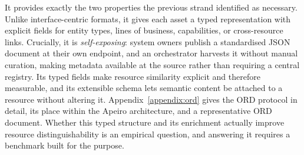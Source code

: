 \documentclass[10pt,twocolumn]{article}
\begin{document}
It provides exactly the two properties the previous strand identified as necessary. Unlike interface-centric formats, it gives each asset a typed representation with explicit fields for entity types, lines of business, capabilities, or cross-resource links. Crucially, it is \emph{self-exposing}: system owners publish a standardised JSON document at their own endpoint, and an orchestrator harvests it without manual curation, making metadata available at the source rather than requiring a central registry. Its typed fields make resource similarity explicit and therefore measurable, and its extensible schema lets semantic content be attached to a resource without altering it. Appendix~\ref{appendix:ord} gives the ORD protocol in detail, its place within the Apeiro architecture, and a representative ORD document. Whether this typed structure and its enrichment actually improve resource distinguishability is an empirical question, and answering it requires a benchmark built for the purpose.
\end{document}
